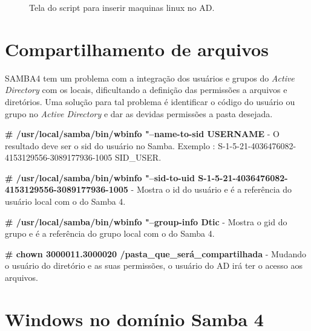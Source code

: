 \begin{figure}[ht]
   	\centering
   	\caption{Tela do script para inserir maquinas linux no AD.}
    \label{smbad}
\end{figure}

\section{Compartilhamento de arquivos}

SAMBA4 tem um problema com a integração dos usuários e grupos do \textit{Active Directory} com os locais, dificultando a definição das permissões a arquivos e diretórios. Uma solução para tal problema é identificar o código do usuário ou grupo no \textit{Active Directory} e dar as devidas permissões a pasta desejada.

\noindent \textbf{\# /usr/local/samba/bin/wbinfo "--name-to-sid USERNAME} - O resultado deve ser o sid do usuário no Samba. Exemplo : S-1-5-21-4036476082-4153129556-3089177936-1005 SID\_USER.

\noindent \textbf{\# /usr/local/samba/bin/wbinfo "--sid-to-uid S-1-5-21-4036476082-4153129556-3089177936-1005} - Mostra o id do usuário e é a referência do usuário local com o do Samba 4.

\noindent \textbf{\# /usr/local/samba/bin/wbinfo "--group-info Dtic} - Mostra o gid do grupo e é a referência do grupo local com o do Samba 4.

\noindent \textbf{\# chown 3000011.3000020 /pasta\_que\_será\_compartilhada} - Mudando o usuário do diretório e as suas permissões, o usuário do AD irá ter o acesso aos arquivos.

\section{Windows no domínio Samba 4}

